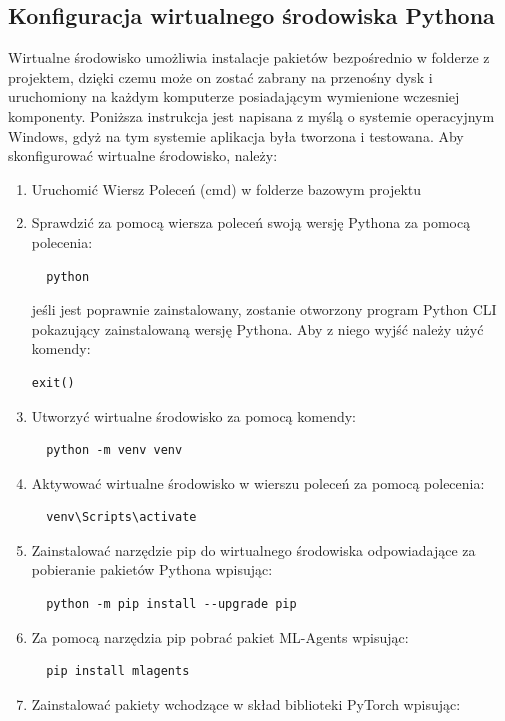 \documentclass{SGGW-thesis}
\begin{document}
\subsection{Konfiguracja wirtualnego środowiska Pythona}
Wirtualne środowisko umożliwia instalacje pakietów bezpośrednio w folderze z projektem, dzięki czemu może on zostać zabrany na przenośny dysk i uruchomiony na każdym komputerze posiadającym wymienione wczesniej komponenty.
Poniższa instrukcja jest napisana z myślą o systemie operacyjnym Windows, gdyż na tym systemie aplikacja była tworzona i testowana.
Aby skonfigurować wirtualne środowisko, należy:
\begin{enumerate}
  \item{Uruchomić Wiersz Poleceń (cmd) w folderze bazowym projektu}
  \item{Sprawdzić za pomocą wiersza poleceń swoją wersję Pythona za pomocą polecenia:
  \begin{lstlisting}
  python
  \end{lstlisting}
  jeśli jest poprawnie zainstalowany, zostanie otworzony program Python CLI pokazujący zainstalowaną wersję Pythona. Aby z niego wyjść należy użyć komendy:
  \begin{lstlisting}[language=Python]
  exit()
  \end{lstlisting}
  }
  \item{Utworzyć wirtualne środowisko za pomocą komendy:
  \begin{lstlisting}
  python -m venv venv
  \end{lstlisting}
  }
  \item{Aktywować wirtualne środowisko w wierszu poleceń za pomocą polecenia:
  \begin{lstlisting}
  venv\Scripts\activate
  \end{lstlisting}
  }
  \item{Zainstalować narzędzie pip do wirtualnego środowiska odpowiadające za pobieranie pakietów Pythona wpisując:
  \begin{lstlisting}
  python -m pip install --upgrade pip
  \end{lstlisting}
  }
  \item{Za pomocą narzędzia pip pobrać pakiet ML-Agents wpisując:
  \begin{lstlisting}
  pip install mlagents
  \end{lstlisting}
  }
  \item{Zainstalować pakiety wchodzące w skład biblioteki PyTorch wpisując:
  \begin{lstlisting}

\end{lstlisting}}
\end{enumerate}
\end{document}
